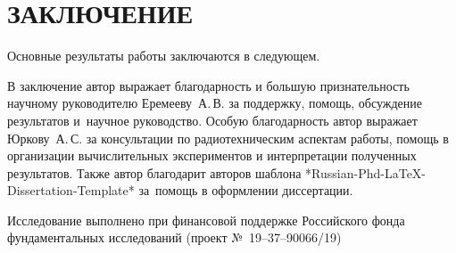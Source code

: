 \chapter*{ЗАКЛЮЧЕНИЕ}                       %


Основные результаты работы заключаются в следующем.


В заключение автор выражает благодарность и большую признательность научному руководителю
Еремееву~А.\,В. за поддержку, помощь, обсуждение результатов и~научное
руководство. Особую благодарность автор выражает Юркову~А.\,С. за консультации по радиотехническим аспектам работы, помощь в организации вычислительных экспериментов и интерпретации полученных результатов. Также автор благодарит авторов шаблона
*Russian-Phd-LaTeX-Dissertation-Template* за~помощь в оформлении
диссертации.

Исследование выполнено при финансовой поддержке Российского фонда фундаментальных исследований (проект №~19--37--90066/19) 